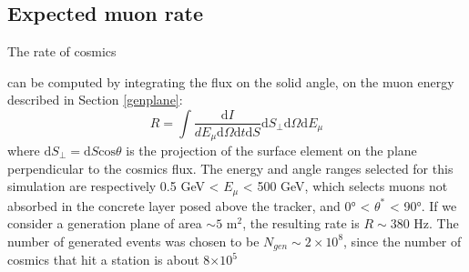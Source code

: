 {\subsection{Expected muon rate}\label{ratetracker}
The rate of cosmics 
%

can be computed by 
integrating the flux on the solid angle, on 
the muon energy described in Section \ref{genplane}:
\begin{equation}
   R= \int \frac{\text{d} I}{d E_\mu \text{d} \Omega \text{d} t \text{d} S} \text{d} S_{\perp} \text{d} \Omega \text{d} E_\mu
    \end{equation}
where $\text{d}S_\perp= \text{d}S \text{cos}\theta$ 
is the projection of the surface element on the 
plane perpendicular to the cosmics flux. 
The energy and angle ranges selected for this 
simulation are respectively 0.5 GeV < $E_\mu$ < 500 GeV, 
which selects  muons not absorbed in the 
concrete layer posed above the tracker, 
and 0° < $\theta^*$ < 90°. 
If we consider a generation plane of  area   
$\sim 5$ m$^2$, the resulting rate is $R \sim 380$ Hz. 
The number of generated events 
was chosen to be $N_{gen}\sim 2\times 10^8$, since the 
number of cosmics that 
hit a station is about 8$\times 10^5$ 

}
